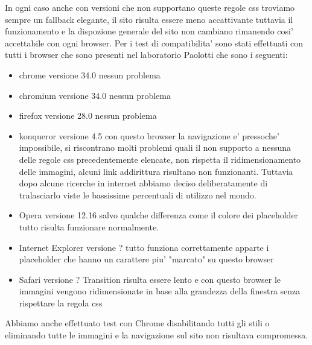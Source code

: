 In ogni caso anche con versioni che non supportano queste regole css troviamo sempre un fallback elegante, il sito risulta essere meno accattivante tuttavia il funzionamento e la dispozione generale del sito non cambiano rimanendo cosi' accettabile con ogni browser.\newline
Per i test di compatibilita' sono stati effettuati con tutti i browser che sono presenti nel laboratorio Paolotti che sono i seguenti:
\begin{itemize}
	\item chrome versione 34.0 nessun problema
	\item chromium versione 34.0 nessun problema
	\item firefox versione 28.0 nessun problema
	\item konqueror versione 4.5 con questo browser la navigazione e' pressoche' impossibile, si riscontrano molti problemi quali il non supporto a nessuna delle regole css precedentemente elencate, non rispetta il ridimensionamento delle immagini, alcuni link addirittura risultano non funzionanti.
Tuttavia dopo alcune ricerche in internet abbiamo deciso deliberatamente di tralasciarlo viste le bassissime percentuali di utilizzo nel mondo.
	\item Opera versione 12.16 salvo qualche differenza come il colore dei placeholder tutto risulta funzionare normalmente.
	\item Internet Explorer versione ? tutto funziona correttamente apparte i placeholder che hanno un carattere piu' "marcato" su questo browser 
	\item Safari versione ? Transition risulta essere lento e con questo browser le immagini vengono ridimensionate in base alla grandezza della finestra senza rispettare la regola css
\end{itemize}

Abbiamo anche effettuato test con Chrome disabilitando tutti gli stili o eliminando tutte le immagini e la navigazione sul sito non risultava compromessa.
